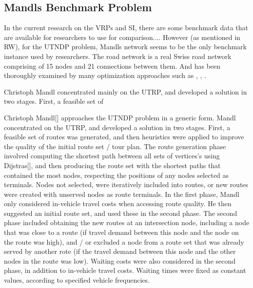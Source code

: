 \subsection{Mandls Benchmark Problem}
In the current research on the VRPs and SI, there are some benchmark data that are available for researchers to use for comparison.... However (as mentioned in RW), for the UTNDP problem, Mandls network seems to be the only benchmark instance used by researchers. The road network is a real Swiss road network comprising of 15 nodes and 21 connections between them. And has been thoroughly examined by many optimization approaches such as \citep{kechagiopoulos14}, \citep{fan09}, \citep{nikolic14}. %

Christoph Mandl concentrated mainly on the UTRP, and developed a solution in two stages. First, a feasible set of

Christoph Mandl[] approaches the UTNDP problem in a generic form. Mandl concentrated on the UTRP, and developed a solution in two stages. First, a feasible set of routes was generated, and then heuristics were applied to improve the quality of the initial route set / tour plan. The route generation phase involved computing the shortest path between all sets of vertices's using Dijstras[], and then producing the route set with the shortest paths that contained the most nodes, respecting the positions of any nodes selected as terminals. Nodes not selected, were iteratively included into routes, or new routes were created with unserved nodes as route terminals. In the first phase, Mandl only considered in-vehicle travel costs when accessing route quality. He then suggested an initial route set, and used these in the second phase. The second phase included obtaining the new routes at an intersection node, including a node that was close to a route (if travel demand between this node and the node on the route was high), and / or excluded a node from a route set that was already served by another rote (if the travel demand between this node and the other nodes in the route was low). Waiting costs were also considered in the second phase, in addition to in-vehicle travel costs. Waiting times were fixed as constant values, according to specified vehicle frequencies. 


